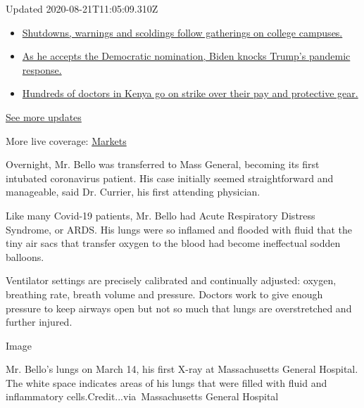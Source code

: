 Updated 2020-08-21T11:05:09.310Z

\begin{itemize}
\tightlist
\item
  \href{https://www.nytimes3xbfgragh.onion/2020/08/21/world/covid-19-coronavirus.html?action=click\&pgtype=Article\&state=default\&region=MAIN_CONTENT_1\&context=storylines_live_updates\#link-4690b6aa}{Shutdowns,
  warnings and scoldings follow gatherings on college campuses.}
\item
  \href{https://www.nytimes3xbfgragh.onion/2020/08/21/world/covid-19-coronavirus.html?action=click\&pgtype=Article\&state=default\&region=MAIN_CONTENT_1\&context=storylines_live_updates\#link-324af071}{As
  he accepts the Democratic nomination, Biden knocks Trump's pandemic
  response.}
\item
  \href{https://www.nytimes3xbfgragh.onion/2020/08/21/world/covid-19-coronavirus.html?action=click\&pgtype=Article\&state=default\&region=MAIN_CONTENT_1\&context=storylines_live_updates\#link-35890b73}{Hundreds
  of doctors in Kenya go on strike over their pay and protective gear.}
\end{itemize}

\href{https://www.nytimes3xbfgragh.onion/2020/08/21/world/covid-19-coronavirus.html?action=click\&pgtype=Article\&state=default\&region=MAIN_CONTENT_1\&context=storylines_live_updates}{See
more updates}

More live coverage:
\href{https://www.nytimes3xbfgragh.onion/live/2020/08/20/business/stock-market-today-coronavirus?action=click\&pgtype=Article\&state=default\&region=MAIN_CONTENT_1\&context=storylines_live_updates}{Markets}

Overnight, Mr. Bello was transferred to Mass General, becoming its first
intubated coronavirus patient. His case initially seemed straightforward
and manageable, said Dr. Currier, his first attending physician.

Like many Covid-19 patients, Mr. Bello had Acute Respiratory Distress
Syndrome, or ARDS. His lungs were so inflamed and flooded with fluid
that the tiny air sacs that transfer oxygen to the blood had become
ineffectual sodden balloons.

Ventilator settings are precisely calibrated and continually adjusted:
oxygen, breathing rate, breath volume and pressure. Doctors work to give
enough pressure to keep airways open but not so much that lungs are
overstretched and further injured.

Image

Mr. Bello's lungs on March 14, his first X-ray at Massachusetts General
Hospital. The white space indicates areas of his lungs that were filled
with fluid and inflammatory cells.Credit...via~Massachusetts General
Hospital

